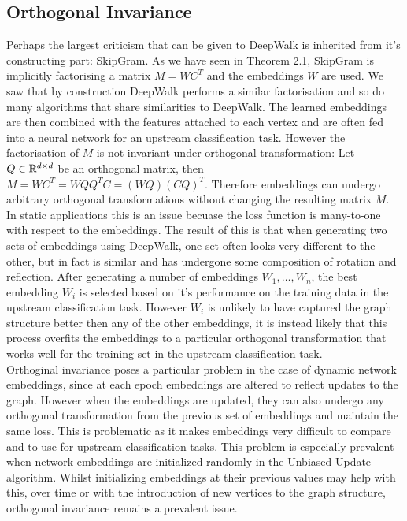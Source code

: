 \documentclass[a4paper]{article}
\begin{document}
\subsection{Orthogonal Invariance}
Perhaps the largest criticism that can be given to DeepWalk is inherited from it's constructing part: SkipGram. As we have
seen in Theorem 2.1, SkipGram is implicitly factorising a matrix $M = WC^T$ and the embeddings $W$ are used. We saw that
by construction DeepWalk performs a similar factorisation and so do many algorithms that share similarities to DeepWalk. The
learned embeddings are then combined with the features attached to each vertex and are often fed into a neural network for an
upstream classification task. However the factorisation of $M$ is not invariant under orthogonal transformation: Let $Q \in \R^{d \times d}$
be an orthogonal matrix, then $M = WC^T = WQQ^TC = (WQ)(CQ)^T$. Therefore embeddings can undergo arbitrary orthogonal transformations
without changing the resulting matrix $M$.\\
In static applications this is an issue becuase the loss function is many-to-one with respect to the embeddings. The result of this is that when generating two sets of 
embeddings using DeepWalk, one set often looks very different to the other, but in fact is similar and has undergone some composition of rotation and reflection. After generating 
a number of embeddings $W_1, \dots, W_n$, the best embedding $W_i$ is selected based on it's performance on the training data in the upstream classification task. However $W_i$ is unlikely to have captured the graph structure
better then any of the other embeddings, it is instead likely that this process overfits the embeddings to a particular orthogonal transformation that works well for the training set in the upstream classification task.\\
Orthoginal invariance poses a particular problem in the case of dynamic network embeddings, since at each epoch embeddings are altered to reflect
updates to the graph. However when the embeddings are updated, they can also undergo any orthogonal transformation from the previous set of embeddings
and maintain the same loss. This is problematic as it makes embeddings very difficult to compare and to use for upstream classification tasks. This problem is especially
prevalent when network embeddings are initialized randomly in the Unbiased Update algorithm. Whilst initializing embeddings at their previous values may help with this,
over time or with the introduction of new vertices to the graph structure, orthogonal invariance remains a prevalent issue.\\
\end{document}
